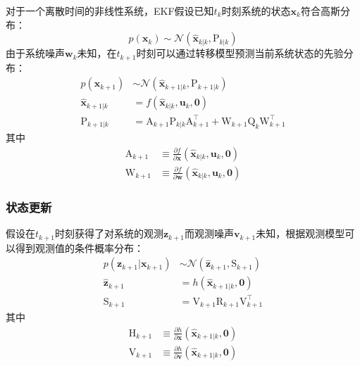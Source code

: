 对于一个离散时间的非线性系统，EKF假设已知$t_k$时刻系统的状态$\bm{x}_k$符合高斯分布：
\begin{equation}
    p(\bm{x}_k) \sim \mathcal{N}(\hat{\bm{x}}_{k|k},\mathrm{P}_{k|k})
\end{equation}
由于系统噪声$\bm{w}_k$未知，在$t_{k+1}$时刻可以通过转移模型预测当前系统状态的先验分布：
\begin{equation}
\begin{aligned}
    p(\bm{x}_{k+1}) &\sim \mathcal{N}(\hat{\bm{x}}_{k+1|k},\mathrm{P}_{k+1|k}) \\
    \hat{\bm{x}}_{k+1|k} &= f(\hat{\bm{x}}_{k|k},\bm{u}_k,\bm{0}) \\
    \mathrm{P}_{k+1|k}   &= \mathrm{A}_{k+1} \mathrm{P}_{k|k} \mathrm{A}_{k+1}^\top +
                            \mathrm{W}_{k+1}\mathrm{Q}_k\mathrm{W}_{k+1}^\top
\end{aligned}
\end{equation}
其中
\begin{equation}
\begin{aligned}
    \mathrm{A}_{k+1} &\equiv
        \frac{\partial f}
             {\partial\bm{x}}(\hat{\bm{x}}_{k|k},\bm{u}_k,\bm{0}) \\
    \mathrm{W}_{k+1} &\equiv
        \frac{\partial f}
             {\partial\bm{w}}(\hat{\bm{x}}_{k|k},\bm{u}_k,\bm{0})
\end{aligned}
\end{equation}

\subsubsection{状态更新}

假设在$t_{k+1}$时刻获得了对系统的观测$\bm{z}_{k+1}$而观测噪声$\bm{v}_{k+1}$未知，根据观测模型可以得到观测值的条件概率分布：
\begin{equation}
\begin{aligned}
    p(\bm{z}_{k+1}|\bm{x}_{k+1}) &\sim \mathcal{N}(\hat{\bm{z}}_{k+1}, \mathrm{S}_{k+1}) \\
    \hat{\bm{z}}_{k+1} &= h(\hat{\bm{x}}_{k+1|k},\bm{0}) \\
    \mathrm{S}_{k+1} &= \mathrm{V}_{k+1}\mathrm{R}_{k+1}\mathrm{V}_{k+1}^\top
\end{aligned}
\end{equation}
其中
\begin{equation}
\begin{aligned}
    \mathrm{H}_{k+1} &\equiv
        \frac{\partial h}
             {\partial\bm{x}}(\hat{\bm{x}}_{k+1|k},\bm{0}) \\
    \mathrm{V}_{k+1} &\equiv
        \frac{\partial h}
             {\partial\bm{v}}(\hat{\bm{x}}_{k+1|k},\bm{0})
\end{aligned}
\end{equation}

